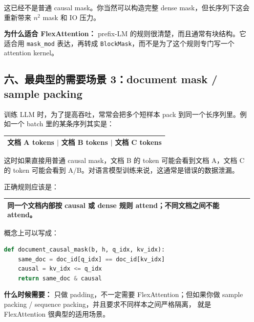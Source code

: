 这已经不是普通 causal mask。你当然可以构造完整 dense mask，但长序列下这会重新带来 $n^2$ mask 和 IO 压力。

\begin{intubox}
\textbf{为什么适合 FlexAttention：} prefix-LM 的规则很清楚，而且通常有块结构。它适合用 \texttt{mask\_mod} 表达，再转成 \texttt{BlockMask}，而不是为了这个规则专门写一个 attention kernel。
\end{intubox}

\subsection{六、最典型的需要场景 3：document mask / sample packing}

训练 LLM 时，为了提高吞吐，常常会把多个短样本 pack 到同一个长序列里。例如一个 batch 里的某条序列其实是：

\begin{center}
\begin{tabular}{p{13.2cm}}
\hline
文档 A tokens $\mid$ 文档 B tokens $\mid$ 文档 C tokens \\
\hline
\end{tabular}
\end{center}

这时如果直接用普通 causal mask，文档 B 的 token 可能会看到文档 A，文档 C 的 token 可能会看到 A/B。对语言模型训练来说，这通常是错误的数据泄漏。

正确规则应该是：

\begin{center}
\begin{tabular}{p{13.2cm}}
\hline
同一个文档内部按 causal 或 dense 规则 attend；不同文档之间不能 attend。 \\
\hline
\end{tabular}
\end{center}

概念上可以写成：

\begin{lstlisting}[language=Python]
def document_causal_mask(b, h, q_idx, kv_idx):
    same_doc = doc_id[q_idx] == doc_id[kv_idx]
    causal = kv_idx <= q_idx
    return same_doc & causal
\end{lstlisting}

\begin{summarybox}
\textbf{什么时候需要：} 只做 padding，不一定需要 FlexAttention；但如果你做 sample packing / sequence packing，并且要求不同样本之间严格隔离， 就是 FlexAttention 很典型的适用场景。
\end{summarybox}

